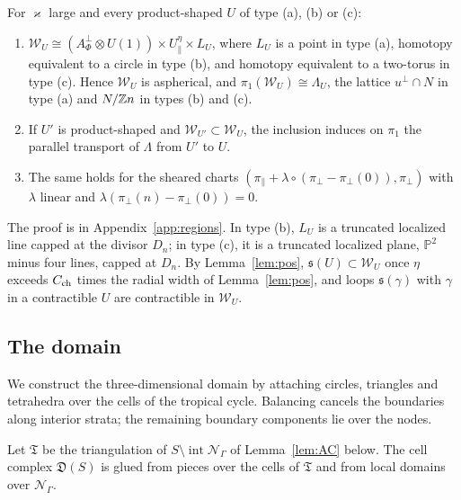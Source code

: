 \begin{lemma}[regions]\label{lem:regions}
For $\varkappa$ large and every product-shaped $U$ of type (a), (b) or (c):
\begin{enumerate}
\item $\mathscr W_U\cong(A_\Phi^\perp\otimes U(1))\times U_\parallel^\eta\times L_U$, where $L_U$ is a point in type (a), homotopy
equivalent to a circle in type (b), and homotopy equivalent to a two-torus in type (c). Hence $\mathscr W_U$ is aspherical, and
$\pi_1(\mathscr W_U)\cong\Lambda_U$, the lattice $u^\perp\cap N$ in type (a) and $N/\mathbb Z n$ in types (b) and (c).
\item If $U'$ is product-shaped and $\mathscr W_{U'}\subset \mathscr W_U$, the inclusion induces on $\pi_1$ the parallel transport of $\Lambda$
from $U'$ to $U$.
\item The same holds for the sheared charts $(\pi_\parallel+\lambda\circ(\pi_\perp-\pi_\perp(0)),\pi_\perp)$ with $\lambda$
linear and $\lambda(\pi_\perp(n)-\pi_\perp(0))=0$.
\end{enumerate}
\end{lemma}
The proof is in Appendix~\ref{app:regions}. In type (b), $L_U$ is a truncated localized line capped at the divisor $D_n$; in
type (c), it is a truncated localized plane, $\mathbb P^2$ minus four lines, capped at $D_n$. By Lemma~\ref{lem:pos},
$\mathfrak s(U)\subset \mathscr W_U$ once $\eta$ exceeds $C_{\rm ch}$ times the radial width of Lemma~\ref{lem:pos}, and loops
$\mathfrak s(\gamma)$ with $\gamma$ in a contractible $U$ are contractible in $\mathscr W_U$.

\subsection{The domain}\label{ssec:res-domain}
We construct the three-dimensional domain by attaching circles, triangles and tetrahedra over the cells of the tropical cycle.
Balancing cancels the boundaries along interior strata; the remaining boundary components lie over the nodes.

Let $\mathfrak T$ be the triangulation of $S\setminus\operatorname{int}\mathcal N_\Gamma$ of Lemma~\ref{lem:AC} below. The
cell complex $\mathfrak D(S)$ is glued from pieces over the cells of $\mathfrak T$ and from local domains over $\mathcal N_\Gamma$.


